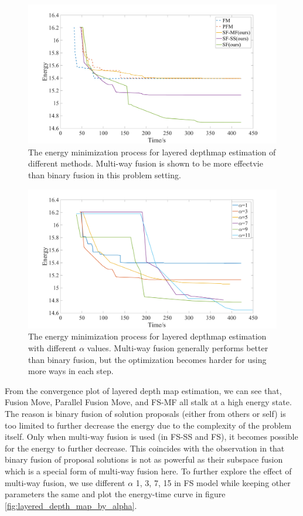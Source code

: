 
\begin{figure}[tb]
  \includegraphics[width=\columnwidth]{figure/layered_depthmap_convergence.png}
  \caption{The energy minimization process for layered depthmap estimation of different methods. Multi-way fusion is shown to be more effectvie than binary fusion in this problem setting.}\label{fig:layered_depthmap_convergence}
\end{figure}
\begin{figure}[tb]
  \includegraphics[width=\columnwidth]{figure/layered_depthmap_by_alpha.png}
  \caption{The energy minimization process for layered depthmap estimation with different $\alpha$ values. Multi-way fusion generally performs better than binary fusion, but the optimization becomes harder for using more ways in each step.}\label{fig:layered_depthmap_by_alpha}
\end{figure}

From the convergence plot of layered depth map estimation, we can see that, Fusion Move, Parallel Fusion Move, and FS-MF all stalk at a high energy state. The reason is binary fusion of solution proposals (either from others or self) is too limited to further decrease the energy due to the complexity of the problem itself. Only when multi-way fusion is used (in FS-SS and FS), it becomes possible for the energy to further decrease. This coincides with the observation in \cite{layered_depthmap} that binary fusion of proposal solutions is not as powerful as their subspace fusion which is a special form of multi-way fusion here. To further explore the effect of multi-way fusion, we use different $\alpha$ {1, 3, 7, 15} in FS model while keeping other parameters the same and plot the energy-time curve in figure \ref{fig:layered_depth_map_by_alpha}.


